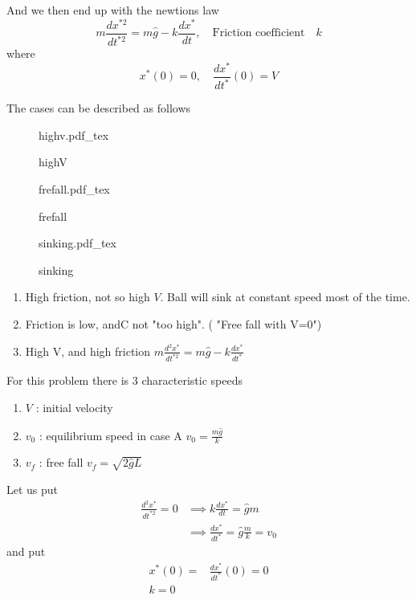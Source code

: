 \documentclass{article}
\newcommand{\incfig}[2][1]{%
\def\svgwidth{#1\columnwidth}
{#2.pdf_tex} } \pdfsuppresswarningpagegroup=1
\theoremstyle{remark}
\begin{document}
  And we then end up with the newtions law \[
  m \frac{d x^{*2}}{d t^{*2}}  = m \hat{g} - k \frac{d x^{*}}{d t}  , \quad  \text{Friction coefficient}\quad k  
  \] 
  where \[
 x^{*}\left( 0 \right) = 0 , \quad  \frac{d x^{*}}{d t^{*}}  \left( 0 \right) = V  
  \] 

  The cases can be described as follows

\begin{figure}[ht]
    \centering
    \incfig{highv}
    \caption{highV}
    \label{fig:highv}
\end{figure}

\begin{figure}[ht]
    \centering
    \incfig{frefall}
    \caption{frefall}
    \label{fig:frefall}
\end{figure}

\begin{figure}[ht]
    \centering
    \incfig{sinking}
    \caption{sinking}
    \label{fig:sinking}
\end{figure}

  \begin{enumerate}
    \item High friction, not so high $V$. Ball will sink at constant speed most of the time.
    \item Friction is low, andC not "too high". ( "Free fall with V=0")
\item High V, and high friction  
$m \frac{d ^2 x^{*}}{d t^{*2} } = m \hat{g} - k  \frac{d x^{*}}{d t^*} $
  \end{enumerate}

  For this problem there is $3$ characteristic speeds 
  \begin{enumerate}
    \item $V$ : initial velocity
    \item $v_{0} $ : equilibrium  speed in case A $v_{0} = \frac{m \hat{g}}{k} $
    \item $v_{f} $ :  free fall $v_{f} = \sqrt{2 \hat{ g} L} $
  \end{enumerate}
   Let us put \[
   \begin{split}
     \frac{d ^2 x ^{*}}{d t^{*2}} = 0  &  \implies  k \frac{d x^{*}}{d t}  = \hat{g}m \\
      & \implies  \frac{d x^{*}}{d t^{*}}  = \hat{g} \frac{m}{k}  = v_{0} 
   \end{split} 
   \] 
   and put \[
   \begin{split}
     x^{*} \left( 0 \right) = &  \frac{d x^{*}}{d t^{*}}  \left( 0 \right) = 0 \\
     k = 0  &  \quad   
   \end{split} 
   \] 
\end{document}

